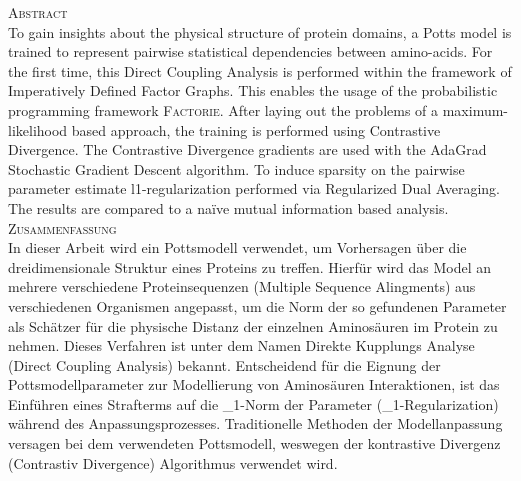 \begin{center}
\textsc{\large Abstract}\\
To gain insights about the physical structure of protein domains, a Potts model is trained to represent pairwise statistical dependencies between amino-acids. For the first time, this Direct Coupling Analysis is performed within the framework of Imperatively Defined Factor Graphs. This enables the usage of the probabilistic programming framework \textsc{Factorie}. After laying out the problems of a maximum-likelihood based approach, the training is performed using Contrastive Divergence. The Contrastive Divergence gradients are used with the AdaGrad Stochastic Gradient Descent algorithm. To induce sparsity on the pairwise parameter estimate l1-regularization performed via Regularized Dual Averaging. The results are compared to a naïve mutual information based analysis.\\[2cm]
\textsc{Zusammenfassung}\\
In dieser Arbeit wird ein Pottsmodell verwendet, um Vorhersagen über die dreidimensionale Struktur eines Proteins zu treffen. Hierfür wird das Model an mehrere verschiedene Proteinsequenzen (Multiple Sequence Alingments) aus verschiedenen Organismen angepasst, um die Norm der so gefundenen Parameter als Schätzer für die physische Distanz der einzelnen Aminosäuren im Protein zu nehmen. Dieses Verfahren ist unter dem Namen Direkte Kupplungs Analyse (Direct Coupling Analysis) bekannt. Entscheidend für die Eignung der Pottsmodellparameter zur Modellierung von Aminosäuren Interaktionen, ist das Einführen eines Strafterms auf die \ell_1-Norm der Parameter (\ell_1-Regularization) während des Anpassungsprozesses. 
Traditionelle Methoden der Modellanpassung versagen bei dem verwendeten Pottsmodell, weswegen der kontrastive Divergenz (Contrastiv Divergence) Algorithmus verwendet wird. 
\end{center}
\clearpage
